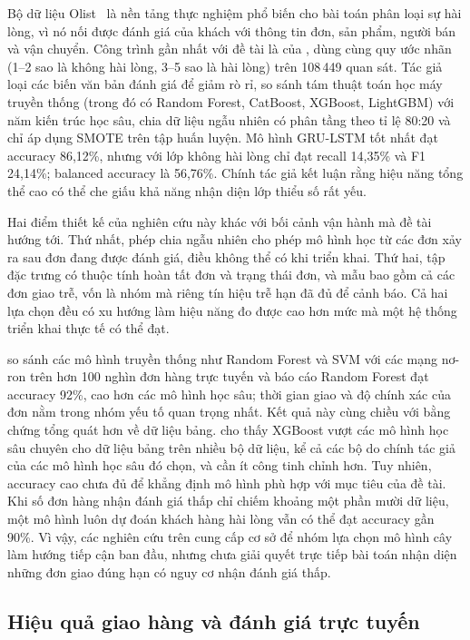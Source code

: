 \documentclass[12pt,a4paper]{report}
\begin{document}
Bộ dữ liệu Olist~\parencite{olist2018} là nền tảng thực nghiệm phổ biến cho bài toán phân loại sự hài lòng, vì nó nối được đánh giá của khách với thông tin đơn, sản phẩm, người bán và vận chuyển. Công trình gần nhất với đề tài là của \textcite{orman2026}, dùng cùng quy ước nhãn (1--2 sao là không hài lòng, 3--5 sao là hài lòng) trên 108\,449 quan sát. Tác giả loại các biến văn bản đánh giá để giảm rò rỉ, so sánh tám thuật toán học máy truyền thống (trong đó có Random Forest, CatBoost, XGBoost, LightGBM) với năm kiến trúc học sâu, chia dữ liệu ngẫu nhiên có phân tầng theo tỉ lệ 80:20 và chỉ áp dụng SMOTE trên tập huấn luyện. Mô hình GRU-LSTM tốt nhất đạt accuracy 86,12\%, nhưng với lớp không hài lòng chỉ đạt recall 14,35\% và F1 24,14\%; balanced accuracy là 56,76\%. Chính tác giả kết luận rằng hiệu năng tổng thể cao có thể che giấu khả năng nhận diện lớp thiểu số rất yếu.

Hai điểm thiết kế của nghiên cứu này khác với bối cảnh vận hành mà đề tài hướng tới. Thứ nhất, phép chia ngẫu nhiên cho phép mô hình học từ các đơn xảy ra sau đơn đang được đánh giá, điều không thể có khi triển khai. Thứ hai, tập đặc trưng có thuộc tính hoàn tất đơn và trạng thái đơn, và mẫu bao gồm cả các đơn giao trễ, vốn là nhóm mà riêng tín hiệu trễ hạn đã đủ để cảnh báo. Cả hai lựa chọn đều có xu hướng làm hiệu năng đo được cao hơn mức mà một hệ thống triển khai thực tế có thể đạt.

\textcite{zaghloul2024} so sánh các mô hình truyền thống như Random Forest và SVM với các mạng nơ-ron trên hơn 100 nghìn đơn hàng trực tuyến và báo cáo Random Forest đạt accuracy 92\%, cao hơn các mô hình học sâu; thời gian giao và độ chính xác của đơn nằm trong nhóm yếu tố quan trọng nhất. Kết quả này cùng chiều với bằng chứng tổng quát hơn về dữ liệu bảng. \textcite{shwartzziv2022} cho thấy XGBoost vượt các mô hình học sâu chuyên cho dữ liệu bảng trên nhiều bộ dữ liệu, kể cả các bộ do chính tác giả của các mô hình học sâu đó chọn, và cần ít công tinh chỉnh hơn. Tuy nhiên, accuracy cao chưa đủ để khẳng định mô hình phù hợp với mục tiêu của đề tài. Khi số đơn hàng nhận đánh giá thấp chỉ chiếm khoảng một phần mười dữ liệu, một mô hình luôn dự đoán khách hàng hài lòng vẫn có thể đạt accuracy gần 90\%. Vì vậy, các nghiên cứu trên cung cấp cơ sở để nhóm lựa chọn mô hình cây làm hướng tiếp cận ban đầu, nhưng chưa giải quyết trực tiếp bài toán nhận diện những đơn giao đúng hạn có nguy cơ nhận đánh giá thấp.

\subsection{Hiệu quả giao hàng và đánh giá trực tuyến}\label{sec:rel-delivery}
\end{document}
